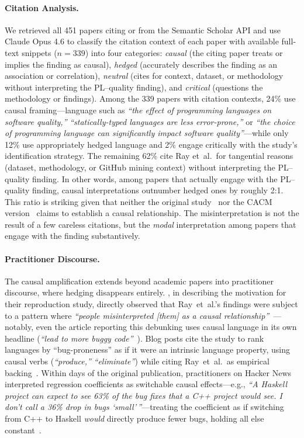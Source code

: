 \paragraph{Citation Analysis.}
We retrieved all 451 papers citing \citet{DBLP:conf/sigsoft/RayPFD14} or \citet{DBLP:journals/cacm/RayPDF17} from the Semantic Scholar API and use Claude Opus 4.6 to classify the citation context of each paper with available full-text snippets ($n = 339$) into four categories: \emph{causal} (the citing paper treats or implies the finding as causal), \emph{hedged} (accurately describes the finding as an association or correlation), \emph{neutral} (cites for context, dataset, or methodology without interpreting the PL--quality finding), and \emph{critical} (questions the methodology or findings).
Among the 339 papers with citation contexts, 24\% use causal framing---language such as \emph{``the effect of programming languages on software quality,''} \emph{``statically-typed languages are less error-prone,''} or \emph{``the choice of programming language can significantly impact software quality''}---while only 12\% use appropriately hedged language and 2\% engage critically with the study's identification strategy.
The remaining 62\% cite Ray et~al.\ for tangential reasons (dataset, methodology, or GitHub mining context) without interpreting the PL--quality finding.
In other words, among papers that actually engage with the PL--quality finding, causal interpretations outnumber hedged ones by roughly 2:1.
This ratio is striking given that neither the original study~\cite{DBLP:conf/sigsoft/RayPFD14} nor the CACM version~\cite{DBLP:journals/cacm/RayPDF17} claims to establish a causal relationship.
The misinterpretation is not the result of a few careless citations, but the \emph{modal} interpretation among papers that engage with the finding substantively.

\paragraph{Practitioner Discourse.}
The causal amplification extends beyond academic papers into practitioner discourse, where hedging disappears entirely.
\citeauthor{DBLP:journals/toplas/BergerHMVV19}, in describing the motivation for their reproduction study, directly observed that Ray~et~al.'s findings were subject to a pattern where \emph{``people misinterpreted [them] as a causal relationship''}~\cite{claburn2019register}---notably, even the article reporting this debunking uses causal language in its own headline (\emph{``lead to more buggy code''}~\cite{claburn2019register}).
Blog posts cite the study to rank languages by ``bug-proneness'' as if it were an intrinsic language property, using causal verbs (\emph{``produce,''} \emph{``eliminate''}) while citing Ray~et~al.\ as empirical backing~\cite{huang2021bugprone}.
Within days of the original publication, practitioners on Hacker News interpreted regression coefficients as switchable causal effects---e.g., \emph{``A Haskell project can expect to see 63\% of the bug fixes that a C++ project would see.
I don't call a 36\% drop in bugs `small'\,''}---treating the coefficient as if switching from C++ to Haskell \emph{would} directly produce fewer bugs, holding all else constant~\cite{hn2014rayetal}.

